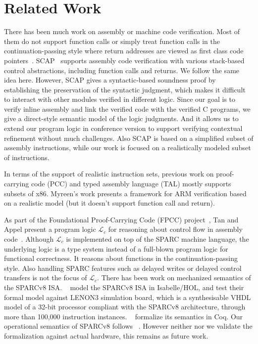 \section{Related Work}
\label{sec:related work}

There has been much work on assembly or
machine code verification. Most of them
do not support function calls or simply
treat function calls in the continuation-passing
style where return addresses are viewed as first
class code pointers~\cite{PCC,FPCC,TAL,TALx86,Yu03ESOP,xcap,cflogic}.
SCAP~\cite{Feng06pldi} supports assembly code verification
with various stack-based control abstractions, including
function calls and returns. We follow the same idea here.
However, SCAP gives a syntactic-based soundness proof
by establishing the preservation of the syntactic judgment,
which makes it difficult to interact with other modules
verified in different logic. Since our goal is to
verify inline assembly and link the verified code
with the verified C programs, we give a direct-style
semantic model of the logic judgments. And it allows us
to extend our program logic in conference version 
to support verifying
contextual refinement without much challenges.
Also SCAP
is based on a simplified subset of assembly instructions,
while our work is focused on a realistically modeled
subset of \sparc{} instructions.

In terms of the support of realistic instruction sets,
previous work on proof-carrying code (PCC) and
typed assembly language (TAL) mostly supports subsets of x86.
Myreen's work \cite{arm-veri} presents a framework for
ARM verification based on a realistic model
(but it doesn't support function call and return).

As part of the Foundational Proof-Carrying Code (FPCC)
project~\cite{FPCC},
Tan and Appel present a program logic $\mathcal{L}_c$
for reasoning about control flow in assembly code~\cite{cflogic}.
Although $\mathcal{L}_c$ is implemented
on top of the SPARC machine language,
the underlying logic is a type system instead
of a full-blown program logic for functional correctness.
It reasons about functions in the continuation-passing
style. Also
handling SPARC features such as delayed writes or delayed
control transfers is not the focus of $\mathcal{L}_c$.
There has been work on mechanized semantics of the SPARCv8 ISA.
~\cite{sparcv8-formalization-Isabelle} model the SPARCv8 ISA
in Isabelle/HOL, and test their formal model against
LENON3 simulation board,
which is a synthesisable VHDL model of a 32-bit processor
compliant with the SPARCv8 architecture,
through more than 100,000 instruction instances.
~\cite{sparc-formalization} formalize its semantics in Coq.
Our operational semantics of SPARCv8 follows ~\cite{sparc-formalization}.
However neither  nor we validate the
formalization against actual hardware, this remains
as future work.


